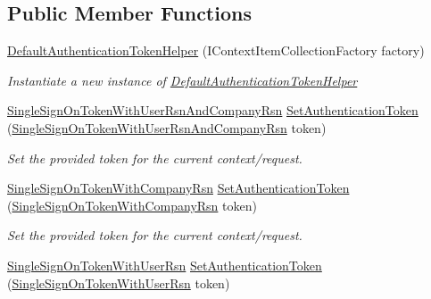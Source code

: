 \subsection*{Public Member Functions}
\begin{DoxyCompactItemize}
\item 
\hyperlink{classCqrs_1_1Authentication_1_1DefaultAuthenticationTokenHelper_a21bfae37d24b180797211396a0348526_a21bfae37d24b180797211396a0348526}{Default\+Authentication\+Token\+Helper} (I\+Context\+Item\+Collection\+Factory factory)
\begin{DoxyCompactList}\small\item\em Instantiate a new instance of \hyperlink{classCqrs_1_1Authentication_1_1DefaultAuthenticationTokenHelper}{Default\+Authentication\+Token\+Helper} \end{DoxyCompactList}\item 
\hyperlink{classCqrs_1_1Authentication_1_1SingleSignOnTokenWithUserRsnAndCompanyRsn}{Single\+Sign\+On\+Token\+With\+User\+Rsn\+And\+Company\+Rsn} \hyperlink{classCqrs_1_1Authentication_1_1DefaultAuthenticationTokenHelper_ab06712f60b8afc6819b5372e3a21e13a_ab06712f60b8afc6819b5372e3a21e13a}{Set\+Authentication\+Token} (\hyperlink{classCqrs_1_1Authentication_1_1SingleSignOnTokenWithUserRsnAndCompanyRsn}{Single\+Sign\+On\+Token\+With\+User\+Rsn\+And\+Company\+Rsn} token)
\begin{DoxyCompactList}\small\item\em Set the provided {\itshape token}  for the current context/request. \end{DoxyCompactList}\item 
\hyperlink{classCqrs_1_1Authentication_1_1SingleSignOnTokenWithCompanyRsn}{Single\+Sign\+On\+Token\+With\+Company\+Rsn} \hyperlink{classCqrs_1_1Authentication_1_1DefaultAuthenticationTokenHelper_a2ae21fb09555d3ab5119f9ea4c69b202_a2ae21fb09555d3ab5119f9ea4c69b202}{Set\+Authentication\+Token} (\hyperlink{classCqrs_1_1Authentication_1_1SingleSignOnTokenWithCompanyRsn}{Single\+Sign\+On\+Token\+With\+Company\+Rsn} token)
\begin{DoxyCompactList}\small\item\em Set the provided {\itshape token}  for the current context/request. \end{DoxyCompactList}\item 
\hyperlink{classCqrs_1_1Authentication_1_1SingleSignOnTokenWithUserRsn}{Single\+Sign\+On\+Token\+With\+User\+Rsn} \hyperlink{classCqrs_1_1Authentication_1_1DefaultAuthenticationTokenHelper_a57d015883b278136590894a3885d246c_a57d015883b278136590894a3885d246c}{Set\+Authentication\+Token} (\hyperlink{classCqrs_1_1Authentication_1_1SingleSignOnTokenWithUserRsn}{Single\+Sign\+On\+Token\+With\+User\+Rsn} token)

\end{DoxyCompactItemize}
